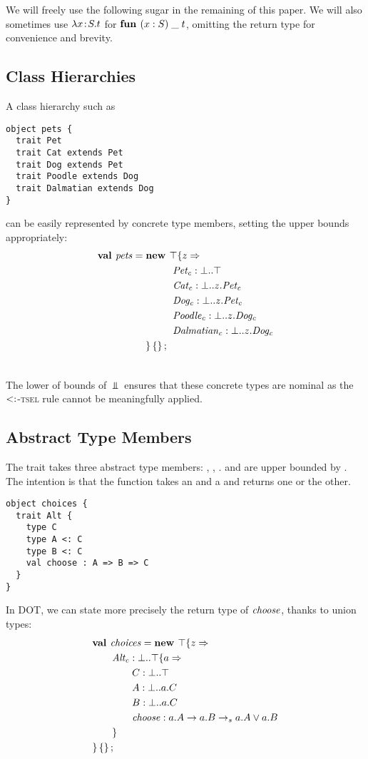 \documentclass[9pt]{sigplanconf}
\begin{document}
We will freely use the following sugar in the remaining of this
paper. We will also sometimes use $\lambda x\!:\!S.t$ for $\textbf{fun } (x:S)\;\_\;t$,
omitting the return type for convenience and brevity.

\subsection{Class Hierarchies}
A class hierarchy such as
\begin{lstlisting}
object pets {
  trait Pet
  trait Cat extends Pet
  trait Dog extends Pet
  trait Poodle extends Dog
  trait Dalmatian extends Dog
}
\end{lstlisting}
can be easily represented by concrete type members, setting the upper
bounds appropriately:
\begin{align*}
\textbf{val }\mathit{pets} = \textbf{new }&\top \{z \Rightarrow \\
&\ \mathit{Pet_c} : \bot..\top\\
&\ \mathit{Cat_c} : \bot..z.{\mathit{Pet_c}}\\
&\ \mathit{Dog_c} : \bot..z.{\mathit{Pet_c}}\\
&\ \mathit{Poodle_c} : \bot..z.{\mathit{Dog_c}}\\
&\ \mathit{Dalmatian_c} : \bot..z.{\mathit{Dog_c}}\\
 \} \left\{\right\} ;\;\\&
\end{align*}

The lower of bounds of $\Bot$ ensures that these concrete types are
nominal as the \textsc{$<:$-tsel} rule cannot be meaningfully
applied.

\subsection{Abstract Type Members}
The  trait takes three abstract type members:
, , .  and  are upper bounded
by . The intention is that the  function takes an
 and a  and returns one or the other.
\begin{lstlisting}
object choices {
  trait Alt {
    type C
    type A <: C
    type B <: C
    val choose : A => B => C
  }
}
\end{lstlisting}
In DOT, we can state more precisely the return type of $\mathit{choose}$,
thanks to union types:
\begin{align*}
&\textbf{val }\mathit{choices} = \textbf{new }\top \{z \Rightarrow \\
&\quad\quad\mathit{Alt_c} : \bot..\top \{a \Rightarrow \\
&\quad\quad\quad\quad C : \bot..\top\\
&\quad\quad\quad\quad A : \bot..a.C\\
&\quad\quad\quad\quad B : \bot..a.C\\
&\quad\quad\quad\quad\mathit{choose} : a.A \rightarrow a.B\rightarrow_sa.A \vee a.B\\
&\quad\quad \}\\
& \}\left\{\right\} ;\;
\end{align*}
\end{document}
